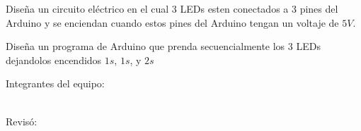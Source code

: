 	Diseña un circuito eléctrico en el cual 3 LEDs esten conectados a 3 pines del Arduino y se enciendan cuando estos pines del Arduino tengan un voltaje de $5V$. \\ \vspace{5cm}

	Diseña un programa de Arduino que prenda secuencialmente los 3 LEDs dejandolos encendidos $1s$, $1s$, y $2s$

	\begin{multicols}{2}
		Integrantes del equipo: \\[0.4cm]
		\horrule{0.5pt} \\[0.4cm] %
		\horrule{0.5pt} %

		Revisó: \\[1.25cm]
		\horrule{0.5pt} \\%
	\end{multicols}






